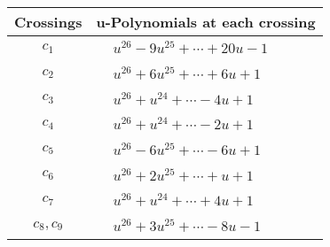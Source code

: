 \documentclass[1p]{elsarticle_modified}
\theoremstyle{definition}
\begin{document}
\begin{tabular}{m{50pt}|m{274pt}}
Crossings & \hspace{64pt}u-Polynomials at each crossing \\
\hline $$\begin{aligned}c_{1}\end{aligned}$$&$\begin{aligned}
&u^{26}-9 u^{25}+\cdots+20 u-1
\end{aligned}$\\
\hline $$\begin{aligned}c_{2}\end{aligned}$$&$\begin{aligned}
&u^{26}+6 u^{25}+\cdots+6 u+1
\end{aligned}$\\
\hline $$\begin{aligned}c_{3}\end{aligned}$$&$\begin{aligned}
&u^{26}+u^{24}+\cdots-4 u+1
\end{aligned}$\\
\hline $$\begin{aligned}c_{4}\end{aligned}$$&$\begin{aligned}
&u^{26}+u^{24}+\cdots-2 u+1
\end{aligned}$\\
\hline $$\begin{aligned}c_{5}\end{aligned}$$&$\begin{aligned}
&u^{26}-6 u^{25}+\cdots-6 u+1
\end{aligned}$\\
\hline $$\begin{aligned}c_{6}\end{aligned}$$&$\begin{aligned}
&u^{26}+2 u^{25}+\cdots+u+1
\end{aligned}$\\
\hline $$\begin{aligned}c_{7}\end{aligned}$$&$\begin{aligned}
&u^{26}+u^{24}+\cdots+4 u+1
\end{aligned}$\\
\hline $$\begin{aligned}c_{8},c_{9}\end{aligned}$$&$\begin{aligned}
&u^{26}+3 u^{25}+\cdots-8 u-1
\end{aligned}$\\

\end{tabular}
\end{document}
